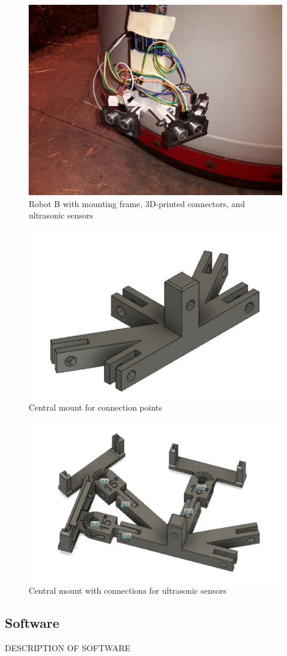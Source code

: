 \documentclass[11pt]{article}
\begin{document}
	\begin{figure}[h]
		\centering
		\includegraphics[scale=0.1]{ultrasonic_mount}
		\caption{Robot B with mounting frame, 3D-printed connectors, and ultrasonic sensors}
	\end{figure}
	
	\begin{figure}[h]
		\centering
		\includegraphics[scale=0.5]{central_mount_empty}
		\caption{Central mount for connection points}
	\end{figure}

	\begin{figure}[h]
		\centering
		\includegraphics[scale=0.5]{central_mount_conns}
		\caption{Central mount with connections for ultrasonic sensors}
	\end{figure}

	\pagebreak
	
	\subsection{Software}
	DESCRIPTION OF SOFTWARE
	
\end{document}
